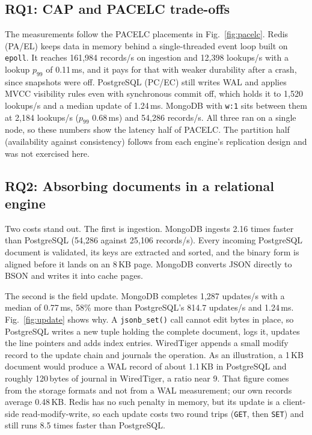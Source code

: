 \documentclass[conference,a4paper]{IEEEtran}
\newcommand{\code}[1]{\texttt{\small #1}}
\begin{document}
\subsection{RQ1: CAP and PACELC trade-offs}
The measurements follow the PACELC placements in Fig.~\ref{fig:pacelc}. Redis (PA/EL) keeps data in memory behind a single-threaded event loop built on \code{epoll}. It reaches 161,984 records/s on ingestion and 12,398 lookups/s with a lookup $p_{99}$ of 0.11\,ms, and it pays for that with weaker durability after a crash, since snapshots were off. PostgreSQL (PC/EC) still writes WAL and applies MVCC visibility rules even with synchronous commit off, which holds it to 1,520 lookups/s and a median update of 1.24\,ms. MongoDB with \code{w:1} sits between them at 2,184 lookups/s ($p_{99}$ 0.68\,ms) and 54,286 records/s. All three ran on a single node, so these numbers show the latency half of PACELC. The partition half (availability against consistency) follows from each engine's replication design and was not exercised here.

\subsection{RQ2: Absorbing documents in a relational engine}
Two costs stand out. The first is ingestion. MongoDB ingests 2.16 times faster than PostgreSQL (54,286 against 25,106 records/s). Every incoming PostgreSQL document is validated, its keys are extracted and sorted, and the binary form is aligned before it lands on an 8\,KB page. MongoDB converts JSON directly to BSON and writes it into cache pages.

The second is the field update. MongoDB completes 1,287 updates/s with a median of 0.77\,ms, 58\% more than PostgreSQL's 814.7 updates/s and 1.24\,ms. Fig.~\ref{fig:update} shows why. A \code{jsonb\_set()} call cannot edit bytes in place, so PostgreSQL writes a new tuple holding the complete document, logs it, updates the line pointers and adds index entries. WiredTiger appends a small modify record to the update chain and journals the operation. As an illustration, a 1\,KB document would produce a WAL record of about 1.1\,KB in PostgreSQL and roughly 120\,bytes of journal in WiredTiger, a ratio near 9. That figure comes from the storage formats and not from a WAL measurement; our own records average 0.48\,KB. Redis has no such penalty in memory, but its update is a client-side read-modify-write, so each update costs two round trips (\code{GET}, then \code{SET}) and still runs 8.5 times faster than PostgreSQL.
\end{document}
